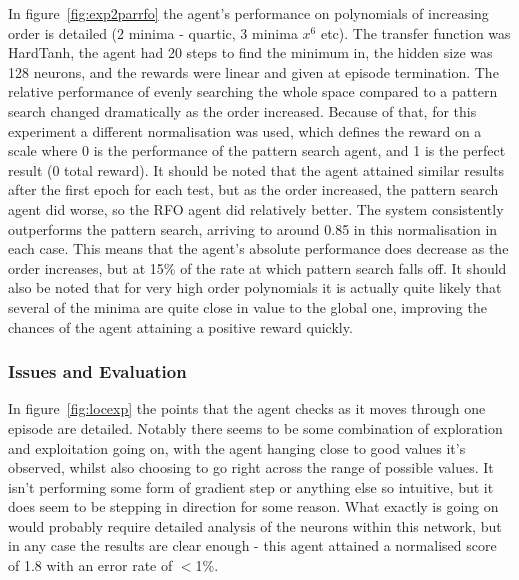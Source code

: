 In figure~\ref{fig:exp2parrfo} the agent's performance on polynomials of increasing order is detailed (2 minima - quartic, 3 minima $x^6$ etc). The transfer function was HardTanh, the agent had 20 steps to find the minimum in, the hidden size was 128 neurons, and the rewards were linear and given at episode termination.  The relative performance of evenly searching the whole space compared to a pattern search changed dramatically as the order increased. Because of that, for this experiment a different normalisation was used, which defines the reward on a scale where 0 is the performance of the pattern search agent, and 1 is the perfect result (0 total reward). It should be noted that the agent attained similar results after the first epoch for each test, but as the order increased, the pattern search agent did worse, so the RFO agent did relatively better. The system consistently outperforms the pattern search, arriving to around 0.85 in this normalisation in each case. This means that the agent's absolute performance does decrease as the order increases, but at 15\% of the rate at which pattern search falls off. It should also be noted that for very high order polynomials it is actually quite likely that several of the minima are quite close in value to the global one, improving the chances of the agent attaining a positive reward quickly.





\subsubsection{Issues and Evaluation}

In figure~\ref{fig:locexp} the points that the agent checks as it moves through one episode are detailed. Notably there seems to be some combination of exploration and exploitation going on, with the agent hanging close to good values it's observed, whilst also choosing to go right across the range of possible values. It isn't performing some form of gradient step or anything else so intuitive, but it does seem to be stepping in direction for some reason. What exactly is going on would probably require detailed analysis of the neurons within this network, but in any case the results are clear enough - this agent attained a normalised score of 1.8 with an error rate of $<$1\%. 


